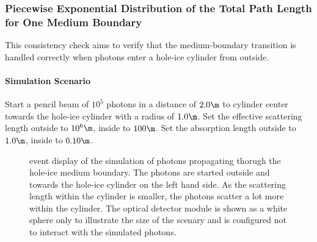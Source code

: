 \subsubsection{Piecewise Exponential Distribution of the Total Path Length for One Medium Boundary}


This consistency check aims to verify that the medium-boundary transition is handled correctly when photons enter a hole-ice cylinder from outside.


%

\paragraph{Simulation Scenario} Start a pencil beam of $10^5$ photons in a distance of $2.0\m$ to cylinder center towards the hole-ice cylinder with a radius of $1.0\m$. Set the effective scattering length outside to $10^6\m$, inside to $100\m$. Set the absorption length outside to $1.0\m$, inside to $0.10\m$.


\begin{figure}[htb]
  \caption{ event display of the simulation of photons propagating thorugh the hole-ice medium boundary. The photons are started outside and towards the hole-ice cylinder on the left hand side. As the scattering length within the cylinder is smaller, the photons scatter a lot more within the cylinder. The optical detector module is shown as a white sphere only to illustrate the size of the scenary and is configured not to interact with the simulated photons.}
\end{figure}

